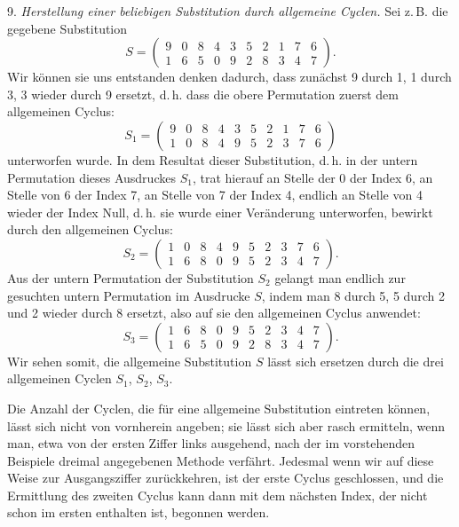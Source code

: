 \documentclass[11pt]{article}
\begin{document}
9. \emph{Herstellung einer beliebigen Substitution durch allgemeine Cyclen.} Sei z.\,B. die gegebene Substitution
\[
S = \begin{pmatrix} 9 & 0 & 8 & 4 & 3 & 5 & 2 & 1 & 7 & 6 \\ 1 & 6 & 5 & 0 & 9 & 2 & 8 & 3 & 4 & 7 \end{pmatrix}.
\]
Wir können sie uns entstanden denken dadurch, dass zunächst 9 durch 1, 1 durch 3, 3 wieder durch 9 ersetzt, d.\,h. dass die obere Permutation zuerst dem allgemeinen Cyclus:
\[
S_1 = \begin{pmatrix} 9 & 0 & 8 & 4 & 3 & 5 & 2 & 1 & 7 & 6 \\ 1 & 0 & 8 & 4 & 9 & 5 & 2 & 3 & 7 & 6 \end{pmatrix}
\]
unterworfen wurde. In dem Resultat dieser Substitution, d.\,h. in der untern Permutation dieses Ausdruckes $S_1$, trat hierauf an Stelle der 0 der Index 6, an Stelle von 6 der Index 7, an Stelle von 7 der Index 4, endlich an Stelle von 4 wieder der Index Null, d.\,h. sie wurde einer Veränderung unterworfen, bewirkt durch den allgemeinen Cyclus:
\[
S_2 = \begin{pmatrix} 1 & 0 & 8 & 4 & 9 & 5 & 2 & 3 & 7 & 6 \\ 1 & 6 & 8 & 0 & 9 & 5 & 2 & 3 & 4 & 7 \end{pmatrix}.
\]
Aus der untern Permutation der Substitution $S_2$ gelangt man endlich zur gesuchten untern Permutation im Ausdrucke $S$, indem man 8 durch 5, 5 durch 2 und 2 wieder durch 8 ersetzt, also auf sie den allgemeinen Cyclus anwendet:
\[
S_3 = \begin{pmatrix} 1 & 6 & 8 & 0 & 9 & 5 & 2 & 3 & 4 & 7 \\ 1 & 6 & 5 & 0 & 9 & 2 & 8 & 3 & 4 & 7 \end{pmatrix}.
\]
Wir sehen somit, die allgemeine Substitution $S$ lässt sich ersetzen durch die drei allgemeinen Cyclen $S_1$, $S_2$, $S_3$.

Die Anzahl der Cyclen, die für eine allgemeine Substitution eintreten können, lässt sich nicht von vornherein angeben; sie lässt sich aber rasch ermitteln, wenn man, etwa von der ersten Ziffer links ausgehend, nach der im vorstehenden Beispiele dreimal angegebenen Methode verfährt. Jedesmal wenn wir auf diese Weise zur Ausgangsziffer zurückkehren, ist der erste Cyclus geschlossen, und die Ermittlung des zweiten Cyclus kann dann mit dem nächsten Index, der nicht schon im ersten enthalten ist, begonnen werden.
\end{document}
